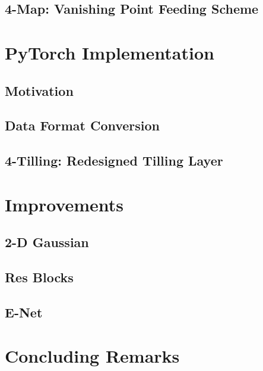 \begin{spacing}{1.5}
\subsection{4-Map: Vanishing Point Feeding Scheme}


\section{PyTorch Implementation}
\label{sec:MD_PyTorch}

\subsection{Motivation}

\subsection{Data Format Conversion}

\subsection{4-Tilling: Redesigned Tilling Layer}



\section{Improvements}
\label{sec:MD_improvement}
\setlength{\parskip}{0.3in}

\subsection{2-D Gaussian}
\label{subsec:IM_2D}

\subsection{Res Blocks}
\label{subsec:IM_resblock}

\subsection{E-Net}
\label{subsec:IM_Enet}



\section{Concluding Remarks}




\end{spacing}
\newpage
